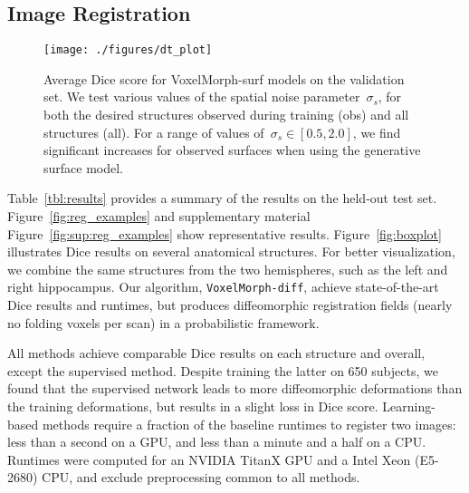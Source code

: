 \documentclass{article}
\begin{document}
\subsection{Image Registration} 



\begin{figure}[t!]
	\centering
	\texttt{[image: ./figures/dt\_plot]}
	\caption{Average Dice score for VoxelMorph-surf models on the validation set. We test various values of the spatial noise parameter~$\sigma_s$, for both the desired structures observed  during training (obs) and all structures (all). For a range of values of~$\sigma_s\in[0.5, 2.0]$, we find significant increases for observed surfaces when using the generative surface model. }
	\label{fig:surf-hyperparams}
\end{figure}




Table~\ref{tbl:results} provides a summary of the results on the held-out test set. Figure~\ref{fig:reg_examples} and supplementary material Figure~\ref{fig:sup:reg_examples} show representative results. Figure~\ref{fig:boxplot} illustrates Dice results on several anatomical structures. For better visualization, we combine the same structures from the two hemispheres, such as the left and right hippocampus. Our algorithm, \verb|VoxelMorph-diff|, achieve state-of-the-art Dice results and runtimes, but produces diffeomorphic registration fields (nearly no folding voxels per scan) in a probabilistic framework. 

{\color{blue}All methods achieve comparable Dice results on each structure and overall, except the supervised method. Despite training the latter on 650 subjects, we found that the supervised network leads to more diffeomorphic deformations than the training deformations, but results in a slight loss in Dice score.} Learning-based methods require a fraction of the baseline runtimes to register two images: less than a second on a GPU, and less than a minute and a half on a CPU. Runtimes were computed for an NVIDIA TitanX GPU and a Intel Xeon (E5-2680) CPU, and exclude preprocessing common to all methods. 
\end{document}
